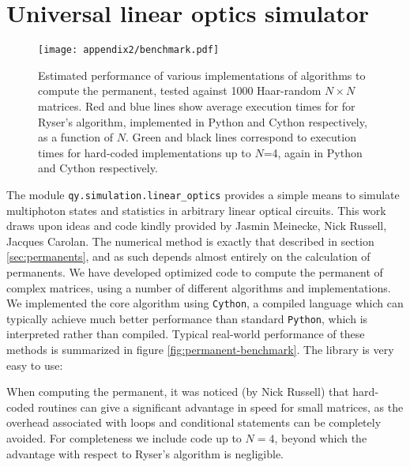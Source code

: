 \section{Universal linear optics simulator}
\begin{figure}[t!]
\texttt{[image: appendix2/benchmark.pdf]}
\caption[Permanent routines: benchmarking]{
    Estimated performance of various implementations of algorithms to compute the permanent, tested against 1000 Haar-random $N \times N$ matrices. Red and blue lines show average execution times for for Ryser's algorithm, implemented in Python and Cython respectively, as a function of $N$. Green and black lines correspond to execution times for hard-coded implementations up to $N$=4, again in Python and Cython respectively.
    \label{fig:permanent-benchmark}
}
\label{fig:permanent-benchmarking}
\end{figure}
The module \texttt{qy.simulation.linear\_optics} provides a simple means to simulate multiphoton states and statistics in arbitrary linear optical circuits. This work draws upon ideas and code kindly provided by Jasmin Meinecke, Nick Russell, Jacques Carolan. The numerical method is exactly that described in section \ref{sec:permanents}, and as such depends almost entirely on the calculation of permanents. We have developed optimized code to compute the permanent of complex matrices, using a number of different algorithms and implementations. We implemented the core algorithm using \texttt{Cython}, a compiled language which can typically achieve much better performance than standard \texttt{Python}, which is interpreted rather than compiled. Typical real-world performance of these methods is summarized in figure \ref{fig:permanent-benchmark}.  The library is very easy to use:



When computing the permanent, it was noticed (by Nick Russell) that hard-coded routines can give a significant advantage in speed for small matrices, as the overhead associated with loops and conditional statements can be completely avoided. For completeness we include code up to $N=4$, beyond which the advantage with respect to Ryser's algorithm is negligible.
\newpage

\newpage

